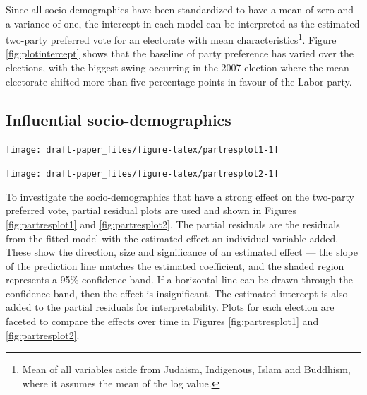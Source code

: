 \documentclass[11pt,a4paper,]{article}
\let\origfigure\figure
\let\endorigfigure\endfigure
\renewenvironment{figure}[1][2] {
    \expandafter\origfigure\expandafter[htbp]
} {
    \endorigfigure
}
\begin{document}
Since all socio-demographics have been standardized to have a mean of
zero and a variance of one, the intercept in each model can be
interpreted as the estimated two-party preferred vote for an electorate
with mean characteristics\footnote{Mean of all variables aside from
  Judaism, Indigenous, Islam and Buddhism, where it assumes the mean of
  the log value.}. Figure \ref{fig:plotintercept} shows that the
baseline of party preference has varied over the elections, with the
biggest swing occurring in the 2007 election where the mean electorate
shifted more than five percentage points in favour of the Labor party.

\subsection{Influential
socio-demographics}\label{influential-socio-demographics}

\begin{figure}[h]

{\centering \texttt{[image: draft-paper\_files/figure-latex/partresplot1-1]} 

}

\caption{Partial residual plots by election year for a selection of predictors. Linear model with 95\% confidence bands is overlaid. Most predictors have a positive relationship: the larger the value the more likely the electorate preferences the Coalition. The relationship is relatively robust over time, with the exception of Unemployment.}\label{fig:partresplot1}
\end{figure}

\begin{figure}[h]

{\centering \texttt{[image: draft-paper\_files/figure-latex/partresplot2-1]} 

}

\caption{Partial residual plots by election year for a selection of predictors. Linear model with 95\% confidence bands is overlaid. Several predictors have a negative relationship: with larger values indicating the electorate more likely preferences Labor. Education exhibits a strong temporal change.}\label{fig:partresplot2}
\end{figure}

To investigate the socio-demographics that have a strong effect on the
two-party preferred vote, partial residual plots are used and shown in
Figures \ref{fig:partresplot1} and \ref{fig:partresplot2}. The partial
residuals are the residuals from the fitted model with the estimated
effect an individual variable added. These show the direction, size and
significance of an estimated effect --- the slope of the prediction line
matches the estimated coefficient, and the shaded region represents a
95\% confidence band. If a horizontal line can be drawn through the
confidence band, then the effect is insignificant. The estimated
intercept is also added to the partial residuals for interpretability.
Plots for each election are faceted to compare the effects over time in
Figures \ref{fig:partresplot1} and \ref{fig:partresplot2}.
\end{document}

